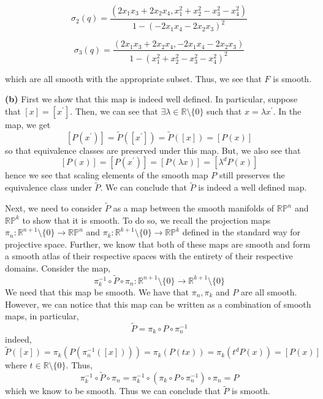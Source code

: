 \documentclass[10pt]{article}
\newcommand{\R}{\mathbb{R}}
\newcommand{\Pro}{\mathbb{P}}
\begin{document}
$$\sigma_{2}(q) = \frac{(2x_{1}x_{3} + 2x_{2}x_{4},x_{1}^{2} + x_{2}^{2} - x_{3}^{2} - x_{4}^{2})}{1 - (-2x_{1}x_{4} - 2x_{2}x_{3})^{2}}$$

$$\sigma_{3}(q) = \frac{(2x_{1}x_{3} + 2x_{2}x_{4},-2x_{1}x_{4} - 2x_{2}x_{3})}{1- (x_{1}^{2} + x_{2}^{2} - x_{3}^{2} - x_{4}^{2})^{2}}$$

which are all smooth with the appropriate subset. Thus, we see that $F$ is smooth.

\textbf{(b)} First we show that this map is indeed well defined. In particular, suppose that $[x] = [x^{\prime}]$. Then, we can see that $\exists \lambda \in \R\setminus \{0\}$ such that $x = \lambda x^{\prime}$. In the map, we get
$$[P(x^{\prime})] = \tilde{P}([x^{\prime}]) = \tilde{P}([x]) = [P(x)]$$
so that equivalence classes are preserved under this map. But, we also see that
$$[P(x)] = [P(x^{\prime})] = [P(\lambda x)] = [\lambda^{d}P(x)]$$
hence we see that scaling elements of the smooth map $P$ still preserves the equivalence class under $\tilde{P}$. We can conclude that $\tilde{P}$ is indeed a well defined map.

Next, we need to consider $\tilde{P}$ as a map between the smooth manifolds of $\R\Pro^{n}$ and $\R\Pro^{k}$ to show that it is smooth. To do so, we recall the projection maps $\pi_{n}: \R^{n+1}\setminus\{0\} \to \R\Pro^{n}$ and $\pi_{k}: \R^{k+1}\setminus\{0\} \to \R\Pro^{k}$ defined in the standard way for projective space. Further, we know that both of these maps are smooth and form a smooth atlas of their respective spaces with the entirety of their respective domains. Consider the map,
$$\pi_{k}^{-1} \circ \tilde{P} \circ \pi_{n}: \R^{n+1}\setminus\{0\} \to \R^{k+1}\setminus \{0\}$$
We need that this map be smooth. We have that $\pi_{n},\pi_{k}$ and $P$ are all smooth. However, we can notice that this map can be written as a combination of smooth maps, in particular,
$$\tilde{P} = \pi_{k} \circ P \circ \pi_{n}^{-1}$$
indeed,
$$\tilde{P}([x]) = \pi_{k}\left(P\left(\pi_{n}^{-1}\left([x]\right)\right)\right) = \pi_{k}\left(P(tx)\right) = \pi_{k}\left(t^{d}P(x)\right) = [P(x)]$$
where $t\in \R\setminus \{0\}$. Thus,
$$\pi_{k}^{-1} \circ \tilde{P} \circ \pi_{n} = \pi_{k}^{-1} \circ \left(\pi_{k} \circ P \circ \pi_{n}^{-1}\right) \circ \pi_{n} = P$$
which we know to be smooth. Thus we can conclude that $\tilde{P}$ is smooth.
\end{document}
